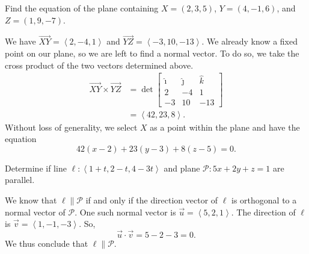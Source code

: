 \documentclass[11pt]{scrartcl}
\begin{document}
\begin{example}
    Find the equation of the plane containing $X = (2, 3, 5)$, $Y = (4, -1, 6)$, and $Z = (1, 9, -7)$.

    \begin{soln}
        We have $\vec{XY} = \left<2, -4, 1\right>$ and $\vec{YZ} = \left<-3, 10, -13\right>$. We already know a fixed point on our plane, so we are left to find a normal vector. To do so, we take the cross product of the two vectors determined above.
        \begin{align*}
            \vec{XY} \times \vec{YZ} &= \det\begin{bmatrix}
                \hat{\imath} & \hat{\jmath} & \hat{k} \\
                2 & -4 & 1 \\
                -3 & 10 & -13
            \end{bmatrix} \\
            &= \left<42, 23, 8\right>.
        \end{align*}
        Without loss of generality, we select $X$ as a point within the plane and have the equation
        \[42(x - 2) + 23(y - 3) + 8(z - 5) = 0.\]
    \end{soln}
\end{example}

\begin{example}
    Determine if line $\ell : \left<1 + t, 2 - t, 4 - 3t\right>$ and plane $\mathcal{P} : 5x + 2y + z = 1$ are parallel.

    \begin{soln}
        We know that $\ell \parallel \mathcal{P}$ if and only if the direction vector of $\ell$ is orthogonal to a normal vector of $\mathcal{P}$. One such normal vector is $\vec{u} = \left<5, 2, 1\right>$. The direction of $\ell$ is $\vec{v} = \left<1, -1, -3\right>$. So,
        \[\vec{u} \cdot \vec{v} = 5 - 2 - 3 = 0.\]
        We thus conclude that $\ell \parallel \mathcal{P}$.
    \end{soln}
\end{example}
\end{document}
